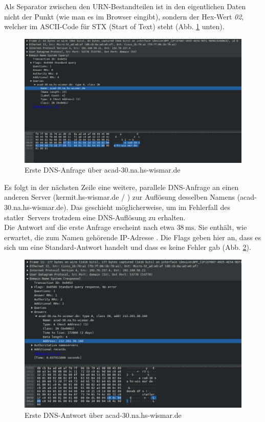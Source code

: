 \documentclass[11pt, a4paper]{article}
\begin{document}
Als Separator zwischen den URN-Bestandteilen ist in den eigentlichen Daten nicht der Punkt (wie man es im Browser eingibt), sondern der Hex-Wert \emph{02}, welcher im ASCII-Code für STX (Start of Text) steht (Abb. \ref{dns_request_acad} unten).

\begin{figure}[H]
  \centering
  \includegraphics[width=\textwidth]{graphics/versuch/3_4/wireshark/dns_request}
  \caption{Erste DNS-Anfrage über acad-30.na.hs-wismar.de}\label{dns_request_acad}
\end{figure}

Es folgt in der nächsten Zeile eine weitere, parallele DNS-Anfrage an einen anderen Server (kermit.hs-wismar.de / ) zur Auflösung desselben Namens (acad-30.na.hs-wismar.de). Das geschieht möglicherweise, um im Fehlerfall des \glqq statler\grqq\ Servers trotzdem eine DNS-Auflösung zu erhalten.\\

Die Antwort auf die erste Anfrage erscheint nach etwa $38 \, \si{\milli\second}$. Sie enthält, wie erwartet, die zum Namen gehörende IP-Adresse . Die Flags geben hier an, dass es sich um eine Standard-Antwort handelt und dass es keine Fehler gab (Abb. \ref{dns_reply_acad}).

\begin{figure}[H]
  \centering
  \includegraphics[width=\textwidth]{graphics/versuch/3_4/wireshark/dns_reply}
  \caption{Erste DNS-Antwort über acad-30.na.hs-wismar.de}\label{dns_reply_acad}
\end{figure}
\end{document}
